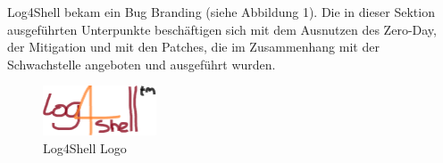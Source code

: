 
Log4Shell bekam ein Bug Branding (siehe Abbildung 1).
Die in dieser Sektion ausgeführten Unterpunkte beschäftigen sich mit dem Ausnutzen des Zero-Day, der Mitigation und mit den Patches, die im Zusammenhang mit der Schwachstelle angeboten und ausgeführt wurden.
\begin{figure}[!htb]\label{fig:log4shell-logo}
    \begin{center}
        \includegraphics[width=0.3\textwidth]{images/log4shell-logo}
    \end{center}
    \caption{Log4Shell Logo}
\end{figure}

